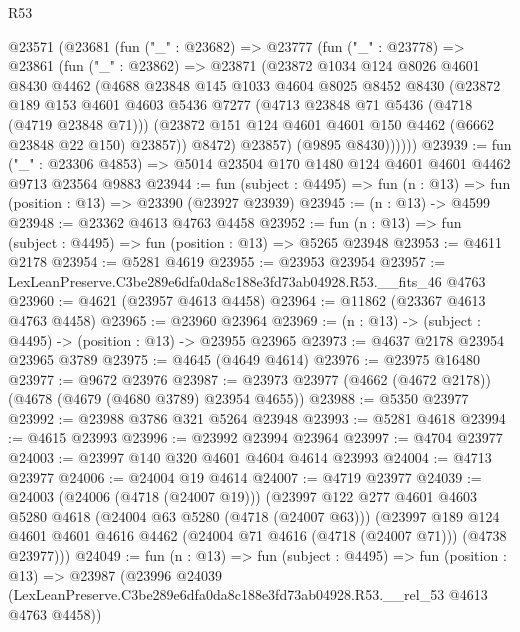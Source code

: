 \begin{lexlean}{R53}
\begin{coremodule}
    @23571
      (@23681
        (fun ("_" : @23682) =>
        @23777
          (fun ("_" : @23778) =>
          @23861
            (fun ("_" : @23862) =>
            @23871
              (@23872
                @1034
                @124
                @8026
                @4601
                @8430
                @4462
                (@4688
                  @23848
                  @145
                  @1033
                  @4604
                  @8025
                  @8452
                  @8430
                  (@23872
                    @189
                    @153
                    @4601
                    @4603
                    @5436
                    @7277
                    (@4713 @23848 @71 @5436 (@4718 (@4719 @23848 @71)))
                    (@23872 @151 @124 @4601 @4601 @150 @4462 (@6662 @23848 @22 @150) @23857))
                  @8472)
                @23857)
              (@9895 @8430))))))
@23939 := fun ("_" : @23306 @4853) =>
  @5014 @23504 @170 @1480 @124 @4601 @4601 @4462 @9713 @23564 @9883
@23944 := fun (subject : @4495) => fun (n : @13) => fun (position : @13) => @23390 (@23927 @23939)
@23945 := (n : @13) -> @4599
@23948 := @23362 @4613 @4763 @4458
@23952 := fun (n : @13) => fun (subject : @4495) => fun (position : @13) => @5265 @23948
@23953 := @4611 @2178
@23954 := @5281 @4619
@23955 := @23953 @23954
@23957 := LexLeanPreserve.C3be289e6dfa0da8c188e3fd73ab04928.R53.__fits_46 @4763
@23960 := @4621 (@23957 @4613 @4458)
@23964 := @11862 (@23367 @4613 @4763 @4458)
@23965 := @23960 @23964
@23969 := (n : @13) -> (subject : @4495) -> (position : @13) -> @23955 @23965
@23973 := @4637 @2178 @23954 @23965 @3789
@23975 := @4645 (@4649 @4614)
@23976 := @23975 @16480
@23977 := @9672 @23976
@23987 := @23973 @23977 (@4662 (@4672 @2178)) (@4678 (@4679 (@4680 @3789) @23954 @4655))
@23988 := @5350 @23977
@23992 := @23988 @3786 @321 @5264 @23948
@23993 := @5281 @4618
@23994 := @4615 @23993
@23996 := @23992 @23994 @23964
@23997 := @4704 @23977
@24003 := @23997 @140 @320 @4601 @4604 @4614 @23993
@24004 := @4713 @23977
@24006 := @24004 @19 @4614
@24007 := @4719 @23977
@24039 := @24003
    (@24006 (@4718 (@24007 @19)))
    (@23997
      @122
      @277
      @4601
      @4603
      @5280
      @4618
      (@24004 @63 @5280 (@4718 (@24007 @63)))
      (@23997
        @189
        @124
        @4601
        @4601
        @4616
        @4462
        (@24004 @71 @4616 (@4718 (@24007 @71)))
        (@4738 @23977)))
@24049 := fun (n : @13) =>
  fun (subject : @4495) =>
  fun (position : @13) =>
  @23987
    (@23996
      @24039
      (LexLeanPreserve.C3be289e6dfa0da8c188e3fd73ab04928.R53.__rel_53 @4613 @4763 @4458))

\end{coremodule}
\end{lexlean}

